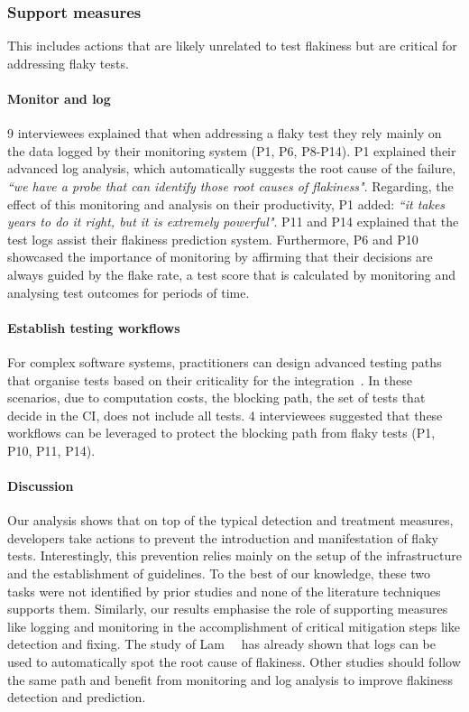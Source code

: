 \subsubsection{Support measures}
This includes actions that are likely unrelated to test flakiness but are critical for addressing flaky tests.

\paragraph{\textbf{Monitor and log}}
9 interviewees explained that when addressing a flaky test they rely mainly on the data logged by their monitoring system (P1, P6, P8-P14).
P1 explained their advanced log analysis, which automatically suggests the root cause of the failure, \textit{``we have a probe that can identify those root causes of flakiness"}.
Regarding, the effect of this monitoring and analysis on their productivity, P1 added: \textit{``it takes years to do it right, but it is extremely powerful"}.
P11 and P14 explained that the test logs assist their flakiness prediction system.
Furthermore, P6 and P10 showcased the importance of monitoring by affirming that their decisions are always guided by the flake rate, a test score that is calculated by monitoring and analysing test outcomes for periods of time.

\paragraph{\textbf{Establish testing workflows}}
For complex software systems, practitioners can design advanced testing paths that organise tests based on their criticality for the integration~\cite{Selenium34:online,WeHaveAF52:online}.
In these scenarios, due to computation costs, the blocking path, \ie the set of tests that decide in the CI, does not include all tests.
4 interviewees suggested that these workflows can be leveraged to protect the blocking path from flaky tests (P1, P10, P11, P14).


\paragraph{\textbf{Discussion}}
Our analysis shows that on top of the typical detection and treatment measures, developers take actions to prevent the introduction and manifestation of flaky tests.
Interestingly, this prevention relies mainly on the setup of the infrastructure and the establishment of guidelines.
To the best of our knowledge, these two tasks were not identified by prior studies and none of the literature techniques supports them.
Similarly, our results emphasise the role of supporting measures like logging and monitoring in the accomplishment of critical mitigation steps like detection and fixing.
The study of Lam~\etal~\cite{Lam2019RootCausing} has already shown that logs can be used to automatically spot the root cause of flakiness. 
Other studies should follow the same path and benefit from monitoring and log analysis to improve flakiness detection and prediction.

